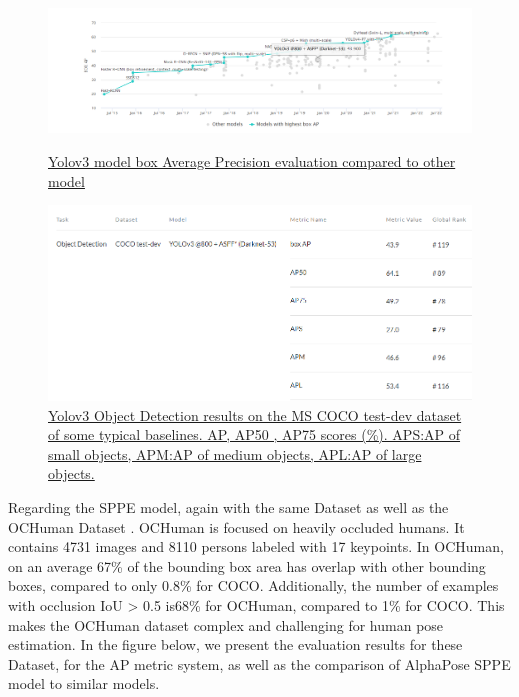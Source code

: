 \begin{figure}[htp]
	\centering
	\includegraphics[width=1\textwidth]{figures/Evaluation/YoloEvaluation.png}
	\captionsetup{labelformat=empty}
    \caption{\href{https://paperswithcode.com/sota/object-detection-on-coco}
	{Yolov3 model box Average Precision evaluation compared to other model}}
	\hspace{1em}%
	\includegraphics[width=1\textwidth]{figures/Evaluation/TotalEvalutationYolo.png}
	\captionsetup{labelformat=empty}
	\caption{\href{https://paperswithcode.com/paper/learning-spatial-fusion-for-single-shot}
	{Yolov3 Object Detection results on the MS COCO test-dev dataset of some typical baselines. AP, AP50 , AP75 scores (\%). APS:AP of small objects, APM:AP of medium objects, APL:AP of large objects.}}
\end{figure}

Regarding the SPPE model, again with the same Dataset as well as the OCHuman Dataset \cite{OCHuman}. OCHuman is focused on heavily occluded humans. It contains 4731 images and 8110 persons labeled with 17 keypoints. In OCHuman, on an average 67\% of the bounding box area has overlap with other bounding
boxes, compared to only 0.8\% for COCO. Additionally, the number of examples with occlusion IoU > 0.5 is68\% for OCHuman, compared to 1\% for COCO. This makes the OCHuman dataset complex and challenging for human pose estimation. In the figure below, we present the evaluation results for these Dataset, for the AP metric system, as well as the comparison of AlphaPose SPPE model to similar models.

